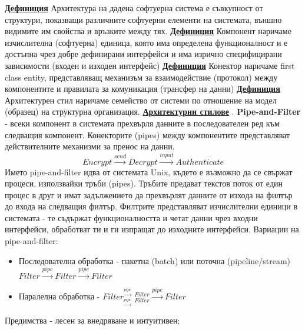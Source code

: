 \documentclass{article}
\begin{document}
\textbf{\underline{Дефиниция}}
Архитектура на дадена софтуерна система е съвкупност от структури, показващи различните софтуерни елементи на
системата, външно видимите им свойства и връзките между тях. \newline\newline
\textbf{\underline{Дефиниция}}
Компонент наричаме изчислителна (софтуерна) единица, която има определена функционалност и е достъпна чрез добре дефинирани
интерфейси и има изрично специфицирани зависимости (входен и изходен интерфейс) \newline\newline
\textbf{\underline{Дефиниция}}
Конектор наричаме first class entity, представляващ механизъм за взаимодействие (протокол) между компонентите и правилата за
комуникация (трансфер на данни) \newline\newline
\textbf{\underline{Дефиниция}}
Архитектурен стил наричаме семейство от системи по отношение на модел (образец) на структурна организация. \newline\newline
\textbf{\underline{Архитектурни стилове}} \newline{}. \textbf{Pipe-and-Filter} - всеки компонент в системата прехвърля данните в последователен ред към следващия компонент.
Конекторите (pipes) между компонентите представляват действителните механизми за пренос на данни.
$$Encrypt \xrightarrow{send} Decrypt \xrightarrow{input} Authenticate$$
Името pipe-and-filter идва от системата Unix, където е възможно да се свържат процеси, използвайки тръби (pipes). Тръбите предават
текстов поток от един процес в друг и имат задължението да прехвърлят данните от изхода на филтър до входа на следващия филтър.
Филтрите представляват изчислителни единици в системата - те съдържат функционалността и четат данни чрез входни интерфейси,
обработват ти и ги изпращат до изходните интерфейси.
Вариации на pipe-and-filter:
\begin{itemize}
    \item Последователна обработка - пакетна (batch) или поточна (pipeline/stream) $Filter \xrightarrow{pipe} Filter \xrightarrow{pipe} Filter$
    \item Паралелна обработка - $Filter _{\xrightarrow{pipe}}^{\xrightarrow{pipe}}$ $_{Filter}^{Filter} \xrightarrow{pipe} Filter$
\end{itemize}
Предимства - лесен за внедряване и интуитивен; \newline
\end{document}
